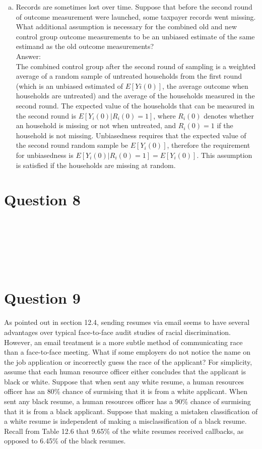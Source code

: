 \documentclass[11pt,notitlepage]{article}\usepackage[]{graphicx}\usepackage[]{color}
\makeatletter
\newenvironment{kframe}{%
 \def\at@end@of@kframe{}%
 \ifinner\ifhmode%
  \def\at@end@of@kframe{\end{minipage}}%
  \begin{minipage}{\columnwidth}%
 \fi\fi%
 \def\FrameCommand##1{\hskip\@totalleftmargin \hskip-\fboxsep
 \colorbox{shadecolor}{##1}\hskip-\fboxsep
     \hskip-\linewidth \hskip-\@totalleftmargin \hskip\columnwidth}%
 \MakeFramed {\advance\hsize-\width
   \@totalleftmargin\z@ \linewidth\hsize
   \@setminipage}}%
 {\par\unskip\endMakeFramed%
 \at@end@of@kframe}
\newenvironment{knitrout}{}{} %
\makeatother
\begin{document}
\begin{enumerate}[a)]
\item Records are sometimes lost over time. Suppose that before the second round of outcome measurement were launched, some taxpayer records went missing. What additional assumption is necessary for the combined old and new control group outcome measurements to be an unbiased estimate of the same estimand as the old outcome measurements?\\
Answer:\\
The combined control group after the second round of sampling is a weighted average of a random sample of untreated households from the first round (which is an unbiased estimated of $E[Yi(0)]$, the average outcome when households are untreated) and the average of the households measured in the second round. The expected value of the households that can be measured in the second round is $E[Y_i(0)|R_i(0)=1]$, where $R_i(0)$ denotes whether an household is missing or not when untreated, and $R_i(0)=1$ if the household is not missing. Unbiasedness requires that the expected value of the second round random sample be $E[Y_i(0)]$, therefore the requirement for unbiasedness is $E[Y_i(0)|R_i(0)=1] = E[Y_i(0)]$. This assumption is satisfied if the households are missing at random. 
\end{enumerate}
\section*{Question 8}
\begin{knitrout}
\color{fgcolor}\begin{kframe}
\begin{verbatim}






\end{verbatim}
\end{kframe}
\end{knitrout}




\section*{Question 9}
As pointed out in section 12.4, sending resumes via email seems to have several advantages over typical face-to-face audit studies of racial discrimination. However, an email treatment is a more subtle method of communicating race than a face-to-face meeting. What if some employers do not notice the name on the job application or incorrectly guess the race of the applicant? For simplicity, assume that each human resource officer either concludes that the applicant is black or white. Suppose that when sent any white resume, a human resources officer has an 80\% chance of surmising that it is from a white applicant. When sent any black resume, a human resources officer has a 90\% chance of surmising that it is from a black applicant. Suppose that making a mistaken classification of a white resume is independent of making a misclassification of a black resume. Recall from Table 12.6 that 9.65\% of the white resumes received callbacks, as opposed to 6.45\% of the black resumes.
\end{document}
